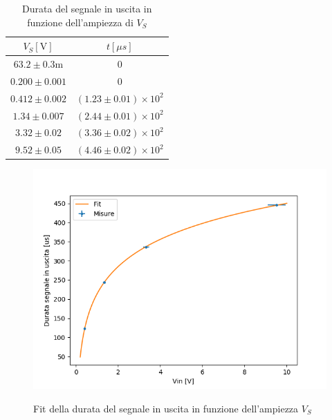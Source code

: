 \documentclass{article}
\begin{document}
		\begin{table}[h]
			\label{tab:durata}
			\begin{center}
				\begin{tabular}{cc}
					\hline
					$V_S [\mathrm{V}]$&$t[\mu s]$ \\
					\hline
					$63.2\pm0.3 \mathrm{m}$ & $0$ \\
					$0.200\pm0.001$ & $0$ \\
					$0.412\pm0.002$ & $(1.23\pm0.01)\times 10^{2}$ \\
					$1.34\pm0.007$ & $(2.44\pm0.01)\times 10^{2}$ \\
					$3.32\pm0.02$ & $(3.36\pm0.02)\times 10^{2}$ \\
					$9.52\pm0.05$ & 	$(4.46\pm0.02)\times 10^{2}$ \\
				\end{tabular}
			\end{center}
			\caption{Durata del segnale in uscita in funzione dell'ampiezza di $V_S$}
		\end{table}
		
		\begin{figure}
			\centering
			\includegraphics[width=\linewidth]{immagini/1c.png}
			\label{fit:1c}
			\caption{Fit della durata del segnale in uscita in funzione dell'ampiezza $V_S$}
		\end{figure}
		
\end{document}
